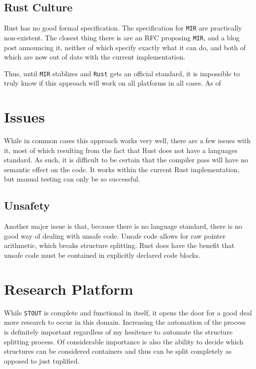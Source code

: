 \documentclass[12pt,oneside]{book}
\newcommand{\rustname}{{\texttt{Rust}}}
\def \rust {\rustname{}\xspace}
\newcommand{\mirname}{{\texttt{MIR}}}
\def \mir {\mirname{}\xspace}
\newcommand{\llvmname}{{\texttt{LLVM}}}
\def \llvm {\llvmname{}\xspace}
\newcommand{\projectname}{{\texttt{STOUT}}}
\def \name{\projectname\xspace}
\begin{document}
\todo[inline]{Maybe talk about why not \llvm }

\section{Rust Culture}
\label{sec:culture}

Rust has no good
formal specification. The specification for \mir are practically non-existent. %
The closest thing there is are an RFC proposing \mir, and a blog post announcing
it, neither of which specify exactly what it can do, and both of which are now
out of date with the current implementation.

Thus, until \mir stablizes and \rust gets an official standard, it is impossible
to truly know if this approach will work on all platforms in all cases. As of 

\chapter{Issues}

While in common cases this approach works very well, there are a few issues with
it, most of which resulting from the fact that Rust does not have a languages
standard. As such, it is difficult to be certain that the compiler pass will
have no semantic effect on the code. It works within the current Rust
implementation, but manual testing can only be so successful.


\section{Unsafety}
\label{sec:unsafe}


Another major issue is that, because there is no language standard, there is no
good way of dealing with unsafe code. Unsafe code allows for raw pointer
arithmetic, which breaks structure splitting. Rust does have the benefit that
unsafe code must be contained in explicitly declared code blocks.

\chapter{Research Platform}

While \name is complete and functional in itself, it opens the door for 
a good deal more research to occur in this domain. Increasing the automation
of the process is definitely important regardless of my hesitence to automate
the structure splitting process. Of considerable importance is also
the ability to decide which structures can be considered containers and thus 
can be split completely as opposed to just tuplified.
\end{document}
